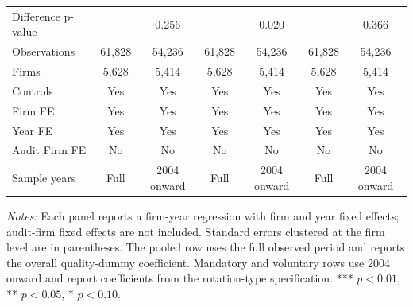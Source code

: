 \begin{table}[htbp]
\begin{threeparttable}
{\begin{tabular}{l cc cc cc}
Difference p-value &  & 0.256 &  & 0.020 &  & 0.366 \\
Observations & 61,828 & 54,236 & 61,828 & 54,236 & 61,828 & 54,236 \\
Firms & 5,628 & 5,414 & 5,628 & 5,414 & 5,628 & 5,414 \\
\midrule
Controls & Yes & Yes & Yes & Yes & Yes & Yes \\
Firm FE & Yes & Yes & Yes & Yes & Yes & Yes \\
Year FE & Yes & Yes & Yes & Yes & Yes & Yes \\
Audit Firm FE & No & No & No & No & No & No \\
Sample years & Full & 2004 onward & Full & 2004 onward & Full & 2004 onward \\
\bottomrule
\end{tabular}}
\begin{tablenotes}\footnotesize
\item \textit{Notes:} Each panel reports a firm-year regression with firm and year fixed effects; audit-firm fixed effects are not included. Standard errors clustered at the firm level are in parentheses. The pooled row uses the full observed period and reports the overall quality-dummy coefficient. Mandatory and voluntary rows use 2004 onward and report coefficients from the rotation-type specification. *** \(p<0.01\), ** \(p<0.05\), * \(p<0.10\).
\end{tablenotes}
\end{threeparttable}
\end{table}
